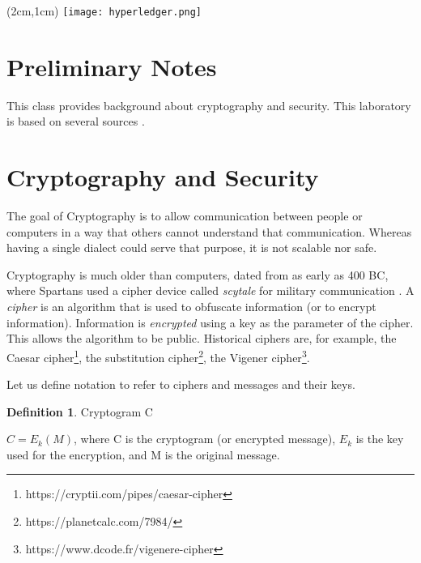 \documentclass[12pt,a4paper]{article}
\theoremstyle{definition}
\newtheorem{definition}{Definition}[section]
\begin{document}
\textblockorigin{-34pt}{-12pt}
\begin{textblock*}{10cm}(2cm,1cm)
\texttt{[image: hyperledger.png]}
\end{textblock*}

\section*{Preliminary Notes}
This class provides background about cryptography and security. This laboratory is based on several sources \cite{sdist2017,rogaway2004,md2020}.






\section{Cryptography and Security}
The goal of Cryptography is to allow communication between people or computers in a way that others cannot understand that communication. Whereas having a single dialect could serve that purpose, it is not scalable nor safe.

Cryptography is much older than computers, dated from as early as 400 BC, where Spartans used a cipher device called \emph{scytale} for military communication \cite{simmons}. A \emph{cipher} is an algorithm that is used to obfuscate information (or to encrypt information). Information is \emph{encrypted} using a key as the parameter of the cipher. This allows the algorithm to be public. Historical ciphers are, for example, the Caesar cipher\footnote{https://cryptii.com/pipes/caesar-cipher}, the substitution cipher\footnote{https://planetcalc.com/7984/}, the Vigener cipher\footnote{https://www.dcode.fr/vigenere-cipher}.

Let us define notation to refer to ciphers and messages and their keys.

\theoremstyle{definition}
\begin{definition}{Cryptogram C}

$C = E_k(M)$, where C is the cryptogram (or encrypted message), $E_k$ is the key used for the encryption, and M is the original message.
\end{definition}
\end{document}
